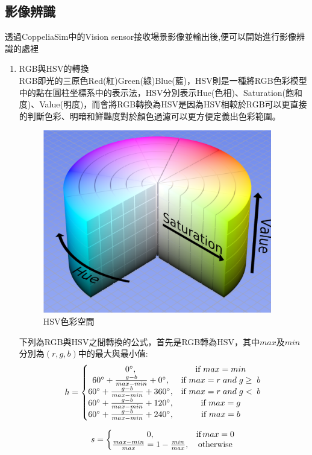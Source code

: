 \documentclass[14pt,a4paper]{report}  %
\begin{document}
\subsection{影像辨識}
 透過CoppeliaSim中的Vision sensor接收場景影像並輸出後,便可以開始進行影像辨識的處裡\\
\begin{enumerate}
\item RGB與HSV的轉換\\
RGB即光的三原色Red(紅)Green(綠)Blue(藍)，HSV則是一種將RGB色彩模型中的點在圓柱坐標系中的表示法，HSV分別表示Hue(色相)、Saturation(飽和度)、Value(明度)，而會將RGB轉換為HSV是因為HSV相較於RGB可以更直接的判斷色彩、明暗和鮮豔度對於顏色過濾可以更方便定義出色彩範圍。\\
\begin{figure}[hbt!]
\center
\includegraphics[width=10cm]{HSV}
\caption{\Large HSV色彩空間}
\end{figure}
\newpage
下列為RGB與HSV之間轉換的公式，首先是RGB轉為HSV，其中$max$及$min$分別為$(r,g,b)$中的最大與最小值:
$$
h=\left\{\begin{matrix}
0^{\circ}, & \textrm{if}\ max=min\\ 
 60^{\circ}+\frac{
g-b}{max-min}+0^{\circ},& \textrm{if}\ max=r\;and\;g\geq \;b\\ 
60^{\circ}+\frac{
g-b}{max-min}+360^{\circ}, & \textrm{if}\ max=r\;and\;g<  \;b\\ 
60^{\circ}+\frac{
g-b}{max-min}+120^{\circ}, & \textrm{if}\ max=g\\ 
60^{\circ}+\frac{
g-b}{max-min}+240^{\circ}, & \textrm{if}\ max=b
\end{matrix}\right.\\$$

$$
s=\left\{\begin{matrix}
0, & \textrm{if}\,max=0\\ 
\frac{max-min}{max}=1-\frac{min}{max}, & \textrm{otherwise}
\end{matrix}\right.\\$$


\end{enumerate}
\end{document}
